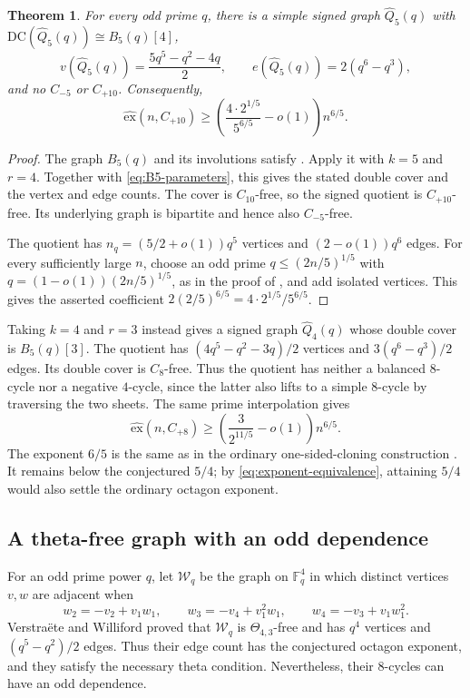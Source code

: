 \documentclass{article}
\newcommand{\DC}{\mathrm{DC}}
\newcommand{\ex}{\mathrm{ex}}
\newcommand{\hex}{\widehat{\ex}}
\newcommand{\FF}{\mathbb{F}}
\newtheorem{theorem}{Theorem}[section]
\theoremstyle{definition}
\theoremstyle{remark}
\begin{document}
\begin{theorem}\label{thm:explicit-C10}\label{cor:all-n-C10}
For every odd prime $q$, there is a simple signed graph $\widehat Q_5(q)$
with $\DC(\widehat Q_5(q))\cong B_5(q)[4]$,
\[
v(\widehat Q_5(q))=\frac{5q^5-q^2-4q}{2},\qquad
e(\widehat Q_5(q))=2(q^6-q^3),
\]
and no $C_{-5}$ or $C_{+10}$.  Consequently,
\[
\hex(n,C_{+10})\geq
\left(\frac{4\cdot2^{1/5}}{5^{6/5}}-o(1)\right)n^{6/5}.
\]
\end{theorem}
\begin{proof}
The graph $B_5(q)$ and its involutions satisfy
.  Apply it with $k=5$ and $r=4$.
Together with \eqref{eq:B5-parameters}, this gives the stated double cover
and the vertex and edge counts.
The cover is $C_{10}$-free, so the signed quotient is $C_{+10}$-free.
Its underlying graph is bipartite and hence also $C_{-5}$-free.

The quotient has $n_q=(5/2+o(1))q^5$ vertices and $(2-o(1))q^6$ edges.
For every sufficiently large $n$, choose an odd prime $q\leq(2n/5)^{1/5}$ with
$q=(1-o(1))(2n/5)^{1/5}$, as in the proof of
, and add isolated vertices.  This gives the
asserted coefficient $2(2/5)^{6/5}=4\cdot2^{1/5}/5^{6/5}$.
\end{proof}

Taking $k=4$ and $r=3$ instead gives a signed graph $\widehat Q_4(q)$
whose double cover is $B_5(q)[3]$.  The quotient has $(4q^5-q^2-3q)/2$ vertices
and $3(q^6-q^3)/2$ edges.  Its double cover is $C_8$-free.  Thus the quotient has
neither a balanced $8$-cycle nor a negative $4$-cycle, since the latter
also lifts to a simple $8$-cycle by traversing the two sheets.  The same
prime interpolation gives
\[
\hex(n,C_{+8})\geq
\left(\frac{3}{2^{11/5}}-o(1)\right)n^{6/5}.
\]
The exponent $6/5$ is the same as in the ordinary one-sided-cloning
construction \cite{LUW1999}.  It remains below the conjectured $5/4$;
by \eqref{eq:exponent-equivalence}, attaining $5/4$ would also settle
the ordinary octagon exponent.

\subsection{A theta-free graph with an odd dependence}

For an odd prime power $q$, let $\mathcal W_q$ be the graph on $\FF_q^4$
in which distinct vertices $v,w$ are adjacent when
\begin{equation}\label{eq:VW-adjacency}
w_2=-v_2+v_1w_1,\qquad
w_3=-v_4+v_1^2w_1,\qquad
w_4=-v_3+v_1w_1^2.
\end{equation}
Verstra\"ete and Williford \cite{VW2019} proved that $\mathcal W_q$ is
$\Theta_{4,3}$-free and has $q^4$ vertices and $(q^5-q^2)/2$ edges.
Thus their edge count has the conjectured octagon exponent, and they satisfy the
necessary theta condition.  Nevertheless, their $8$-cycles can have an
odd dependence.
\end{document}
